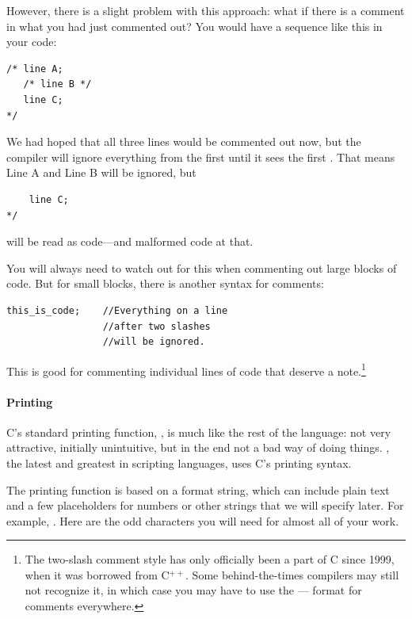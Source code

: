 However, there is a slight problem with this approach: what if there is a comment in what you had just
commented out? You would have a sequence like this in your code: 
\begin{lstlisting}
/* line A; 
   /* line B */ 
   line C; 
*/
\end{lstlisting}
We had hoped that all three lines would be commented out now, but the compiler will ignore everything
from the first \ci{/*} until it sees the first \ci{*/}. That means Line A and Line B will be ignored,
but 
\begin{lstlisting}
    line C; 
*/
\end{lstlisting}
will be read as code---and malformed code at that.

You will always need to watch out for this when commenting out large blocks of code. But for small
blocks, there is another syntax for comments:
\begin{verbatim}
this_is_code;    //Everything on a line 
                 //after two slashes 
                 //will be ignored.
\end{verbatim}

This is good for commenting individual lines of code that deserve a
note.\footnote{The two-slash comment style has only officially been
a part of C since 1999, when it was borrowed from C$^{++}$. Some
behind-the-times compilers may still not recognize it, in which case
you may have to use the \ci{/*} --- \ci{*/} format for comments
everywhere.}


\paragraph{Printing}
\label{printf}
C's standard printing function, , is much like the rest of
the language: not very attractive, initially unintuitive, but in the end
not a bad way of doing things. , the latest and greatest in
scripting languages, uses C's printing syntax.

The printing function is based on a format string, which
can include plain text and a few placeholders for numbers or other
strings that we will specify later. For example, .  Here are the odd characters you
will need for almost all of your work. 

\begin{center}
\end{center}

